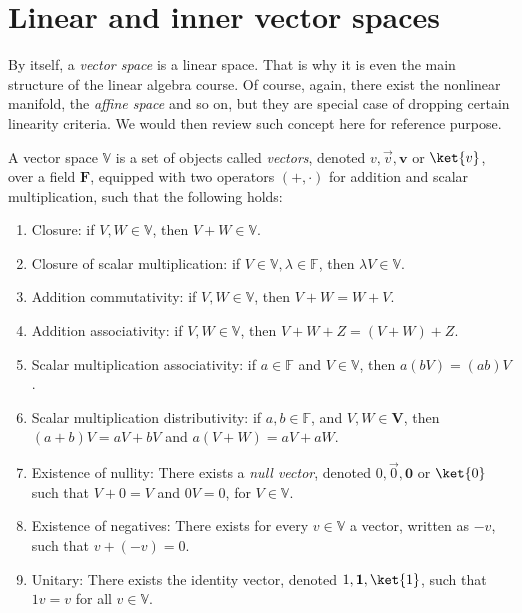 \section{Linear and inner vector spaces}

By itself, a \textit{vector space} is a linear space. That is why it is even the main structure of the linear algebra course. Of course, again, there exist the nonlinear manifold, the \textit{affine space} and so on, but they are special case of dropping certain linearity criteria. We would then review such concept here for reference purpose. 

\begin{definition}
    A vector space $\mathbb{V}$ is a set of objects called \textit{vectors}, denoted $v,\vec{v},\mathbf{v}$ or $\ket{v}$, over a field $\mathbf{F}$, equipped with two operators $(+,\cdot)$ for addition and scalar multiplication, such that the following holds: 
    \begin{enumerate}[topsep=1pt,itemsep=1pt,leftmargin=1cm]
        \item Closure: if $V,W\in \mathbb{V}$, then $V+W\in\mathbb{V}$. 
        \item Closure of scalar multiplication: if $V\in \mathbb{V},\lambda\in \mathbb{F}$, then $\lambda V\in \mathbb{V}$. 
        \item Addition commutativity: if $V,W\in \mathbb{V}$, then $V+W=W+V$. 
        \item Addition associativity: if $V,W\in \mathbb{V}$, then $V+W+Z=(V+W)+Z$.
        \item Scalar multiplication associativity: if $a\in \mathbb{F}$ and $V\in\mathbb{V}$, then $a(bV)=(ab)V$. 
        \item Scalar multiplication distributivity: if $a,b\in\mathbb{F}$, and $V,W\in\mathbf{V}$, then $(a+b)V=aV+bV$ and $a(V+W)=aV+aW$. 
        \item Existence of nullity: There exists a \textit{null vector}, denoted $0,\vec{0},\mathbf{0}$ or $\ket{0}$ such that $V+0=V$ and $0V =0$, for $V\in\mathbb{V}$. 
        \item Existence of negatives: There exists for every $v\in\mathbb{V}$ a vector, written as $-v$, such that $v+(-v)=0$. 
        \item Unitary: There exists the identity vector, denoted $1,\mathbf{1},\ket{1}$, such that $1v=v$ for all $v\in\mathbb{V}$. 
    \end{enumerate}
\end{definition}
